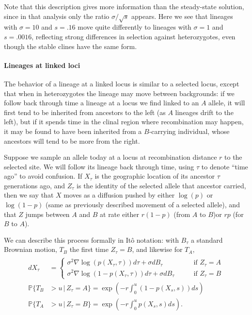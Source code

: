 \documentclass[11pt,letterpaper]{article}
\renewcommand{\P}{\mathbb{P}}
\newcommand{\grad}{\nabla}
\newcommand{\given}{\,\vert\,}
\begin{document}
Note that this description gives more information than the steady-state solution,
since in that analysis only the ratio $\sigma/\sqrt{s}$ appears.
Here we see that lineages with $\sigma=10$ and $s=.16$ move quite differently
to lineages with $\sigma=1$ and $s=.0016$,
reflecting strong differences in selection against heterozygotes,
even though the stable clines have the same form.

\paragraph{Lineages at linked loci}
The behavior of a lineage at a linked locus is similar to a selected locus,
except that when in heterozygotes the lineage may move between backgrounds:
if we follow back through time a lineage at a locus we find linked to an $A$ allele, 
it will first tend to be inherited from ancestors to the left (as $A$ lineages drift to the left),
but if it spends time in the clinal region where recombination may happen,
it may be found to have been inherited from a $B$-carrying individual,
whose ancestors will tend to be more from the right.

Suppose we sample an allele today at a locus at recombination distance $r$ to the selected site.
We will follow its lineage back through time, using $\tau$ to denote ``time ago'' to avoid confusion.
If $X_\tau$ is the geographic location of its ancestor $\tau$ generations ago,
and $Z_\tau$ is the identity of the selected allele that ancestor carried,
then we say that $X$ moves as a diffusion pushed by either $\log(p)$ or $\log(1-p)$ (same as previously described movement of a selected allele),
and that $Z$ jumps between $A$ and $B$ at rate either $r (1-p)$  (from $A$ to $B$)or $r p$ (for $B$ to $A$).

We can describe this process formally in It\^o notation:
with $B_\tau$ a standard Brownian motion,
$T_B$ the first time $Z_\tau = B$, and likewise for $T_A$,
\begin{align}
    \begin{aligned} \label{eqn:lineage_motion}
        dX_\tau &= \begin{cases}
             \sigma^2 \grad \log(p(X_\tau,\tau)) d\tau + \sigma dB_\tau \qquad & \text{if } Z_\tau = A \\
             \sigma^2 \grad \log(1-p(X_\tau,\tau)) d\tau + \sigma dB_\tau \qquad & \text{if } Z_\tau = B 
        \end{cases} \\
        \P\{ T_B &> u \given Z_\tau = A \} = \exp\left( - r \int_0^u (1-p(X_s,s)) ds \right) \\
        \P\{ T_A &> u \given Z_\tau = B \} = \exp\left( - r \int_0^u p(X_s,s) ds \right) .
    \end{aligned}
\end{align}
\end{document}
